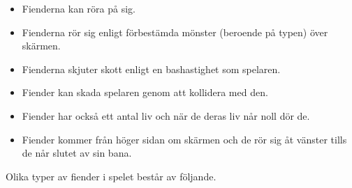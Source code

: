 \documentclass{TDP005mall}
\begin{document}
\begin{itemize}
\item Fienderna kan röra på sig.
\item Fienderna rör sig enligt förbestämda mönster (beroende på typen) över skärmen.
\item Fienderna skjuter skott enligt en bashastighet som spelaren.
\item Fiender kan skada spelaren genom att kollidera med den.
\item Fiender har också ett antal liv och när de deras liv når noll dör de.
\item Fiender kommer från höger sidan om skärmen och de rör sig åt vänster tills de når slutet av sin bana.
\end{itemize}

Olika typer av fiender i spelet består av följande.
\end{document}
